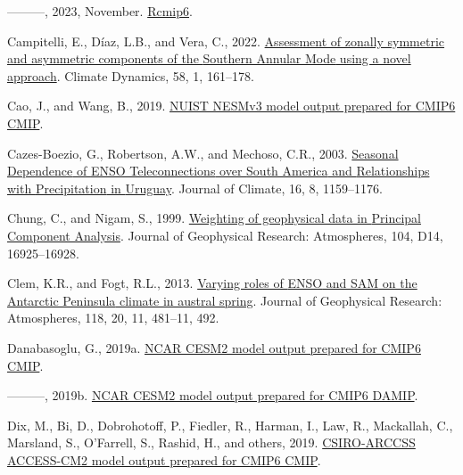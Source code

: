 \documentclass[12pt,oneside]{reedthesis}
\newlength{\cslhangindent}
\newenvironment{CSLReferences}[2] %
 {%
  \setlength{\parindent}{0pt}
  \ifodd #1 \everypar{\setlength{\hangindent}{\cslhangindent}}\ignorespaces\fi
  \ifnum #2 > 0
  \setlength{\parskip}{#2\baselineskip}
  \fi
 }%
 {}
\begin{document}
\begin{CSLReferences}{1}{0}
\leavevmode{}%
---------, 2023, November. \href{https://doi.org/10.5281/zenodo.10138834}{Rcmip6}.

\leavevmode{}%
Campitelli, E., Díaz, L.B., and Vera, C., 2022. \href{https://doi.org/10.1007/s00382-021-05896-5}{Assessment of zonally symmetric and asymmetric components of the {Southern Annular Mode} using a novel approach}. Climate Dynamics, 58, 1, 161--178.

\leavevmode{}%
Cao, J., and Wang, B., 2019. \href{https://doi.org/10.22033/ESGF/CMIP6.2021}{NUIST NESMv3 model output prepared for CMIP6 CMIP}.

\leavevmode{}%
Cazes-Boezio, G., Robertson, A.W., and Mechoso, C.R., 2003. \href{https://doi.org/10.1175/1520-0442(2003)16\%3C1159:SDOETO\%3E2.0.CO;2}{Seasonal {Dependence} of {ENSO Teleconnections} over {South America} and {Relationships} with {Precipitation} in {Uruguay}}. Journal of Climate, 16, 8, 1159--1176.

\leavevmode{}%
Chung, C., and Nigam, S., 1999. \href{https://doi.org/10.1029/1999JD900234}{Weighting of geophysical data in {Principal Component Analysis}}. Journal of Geophysical Research: Atmospheres, 104, D14, 16925--16928.

\leavevmode{}%
Clem, K.R., and Fogt, R.L., 2013. \href{https://doi.org/10.1002/jgrd.50860}{Varying roles of {ENSO} and {SAM} on the {Antarctic Peninsula} climate in austral spring}. Journal of Geophysical Research: Atmospheres, 118, 20, 11, 481--11, 492.

\leavevmode{}%
Danabasoglu, G., 2019a. \href{https://doi.org/10.22033/ESGF/CMIP6.2185}{NCAR CESM2 model output prepared for CMIP6 CMIP}.

\leavevmode{}%
---------, 2019b. \href{https://doi.org/10.22033/ESGF/CMIP6.2187}{NCAR CESM2 model output prepared for CMIP6 DAMIP}.

\leavevmode{}%
Dix, M., Bi, D., Dobrohotoff, P., Fiedler, R., Harman, I., Law, R., Mackallah, C., Marsland, S., O'Farrell, S., Rashid, H., and others, 2019. \href{https://doi.org/10.22033/ESGF/CMIP6.2281}{CSIRO-ARCCSS ACCESS-CM2 model output prepared for CMIP6 CMIP}.


\end{CSLReferences}
\end{document}
